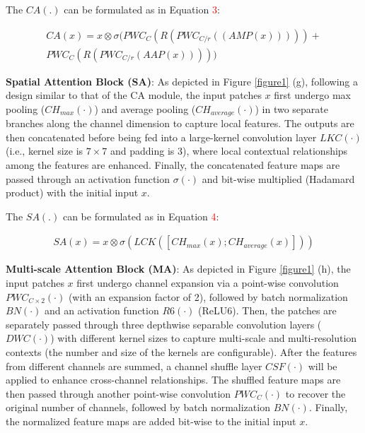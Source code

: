 \documentclass[letterpaper, 10 pt, conference]{ieeeconf}  %
\begin{document}
The $CA(.)$ can be formulated as in Equation \textcolor{red}{3}:
\begin{scriptsize}   
\begin{align}
  CA(x) = x \otimes \sigma(PWC_{C}(R(PWC_{C/r}((AMP(x))))) + \nonumber
  \\PWC_{C}(R(PWC_{C/r}(AAP(x)))))
\end{align}
\end{scriptsize}

\textbf{Spatial Attention Block (SA)}\cite{woo2018cbam}: As depicted in Figure \textcolor{red}{\ref{figure1}} (g), following a design similar to that of the CA module, the input patches $x$ first undergo max pooling ($CH_{max}(\cdot)$) and average pooling ($CH_{average}(\cdot)$) in two separate branches along the channel dimension to capture local features. The outputs are then concatenated before being fed into a large-kernel convolution layer $LKC(\cdot)$ (i.e., kernel size is $7\times7$ and padding is 3), where local contextual relationships among the features are enhanced. Finally, the concatenated feature maps are passed through an activation function $\sigma(\cdot)$ and bit-wise multiplied (Hadamard product) with the initial input $x$.

The $SA(.)$ can be formulated as in Equation \textcolor{red}{4}:
\begin{scriptsize}   
\begin{align}
  SA(x) = x \otimes \sigma(LCK([CH_{max}(x); CH_{average}(x)]))
\end{align}
\end{scriptsize}

\textbf{Multi-scale Attention Block (MA)}: As depicted in Figure \textcolor{red}{\ref{figure1}} (h), the input patches $x$ first undergo channel expansion via a point-wise convolution $PWC_{C\times 2}(\cdot)$ (with an expansion factor of 2), followed by batch normalization $BN(\cdot)$ and an activation function $R6(\cdot)$ (ReLU6). Then, the patches are separately passed through three depthwise separable convolution layers ($DWC(\cdot)$) with different kernel sizes to capture multi-scale and multi-resolution contexts (the number and size of the kernels are configurable). After the features from different channels are summed, a channel shuffle layer $CSF(\cdot)$ will be applied to enhance cross-channel relationships. The shuffled feature maps are then passed through another point-wise convolution $PWC_C(\cdot)$ to recover the original number of channels, followed by batch normalization $BN(\cdot)$. Finally, the normalized feature maps are added bit-wise to the initial input $x$.
\end{document}
